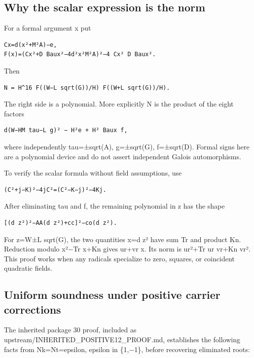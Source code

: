 \documentclass[
  10pt,
]{article}
\begin{document}
\subsection{Why the scalar expression is the
norm}\label{why-the-scalar-expression-is-the-norm}

For a formal argument x put

\begin{verbatim}
Cx=d(x²+M²A)−e,
F(x)=(Cx²+D Baux²−4d²x²M²A)²−4 Cx² D Baux².
\end{verbatim}

Then

\begin{verbatim}
N = H^16 F((W−L sqrt(G))/H) F((W+L sqrt(G))/H).
\end{verbatim}

The right side is a polynomial. More explicitly N is the product of the
eight factors

\begin{verbatim}
d(W−HM tau−L g)² − H²e + H² Baux f,
\end{verbatim}

where independently tau=±sqrt(A), g=±sqrt(G), f=±sqrt(D). Formal signs
here are a polynomial device and do not assert independent Galois
automorphisms.

To verify the scalar formula without field assumptions, use

\begin{verbatim}
(C²+j−K)²−4jC²=(C²−K−j)²−4Kj.
\end{verbatim}

After eliminating tau and f, the remaining polynomial in z has the shape

\begin{verbatim}
[(d z²)²−AA(d z²)+cc]²−co(d z²).
\end{verbatim}

For z=W±L sqrt(G), the two quantities x=d z² have sum Tr and product Kn.
Reduction modulo x²−Tr x+Kn gives ur+vr x. Its norm is ur²+Tr ur vr+Kn
vr². This proof works when any radicals specialize to zero, squares, or
coincident quadratic fields.

\subsection{Uniform soundness under positive carrier
corrections}\label{uniform-soundness-under-positive-carrier-corrections}

The inherited package 30 proof, included as
upstream/INHERITED\_POSITIVE12\_PROOF.md, establishes the following
facts from Nk=Nt=epsilon, epsilon in \{1,−1\}, before recovering
eliminated roots:
\end{document}
